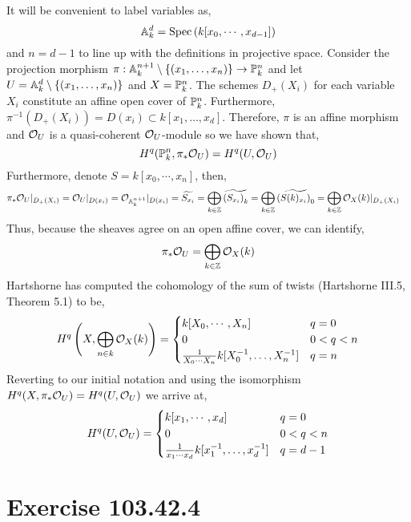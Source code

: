 \documentclass[12pt]{article}
\begin{document}
It will be convenient to label variables as,
\[ \A^d_k = \Spec{k[x_0, \cdots, x_{d-1}]} \]
and $n = d-1$ to line up with the definitions in projective space. Consider the projection morphism $\pi : \A^{n+1}_k \setminus \{ (x_1, \dots, x_n) \} \to \P^{n}_k$ and let $U = \A^d_k \setminus \{ (x_1, \dots, x_n) \}$ and $X = \P^n_k$. The schemes $D_{+}(X_i)$ for each variable $X_i$ constitute an affine open cover of $\P^{n}_k$. Furthermore, $\pi^{-1}(D_{+}(X_i)) = D(x_{i}) \subset k[x_1, \dots, x_d]$. Therefore, $\pi$ is an affine morphism and $\struct{U}$ is a quasi-coherent $\struct{U}$-module so we have shown that,
\[ H^q(\P^{n}_k, \pi_* \struct{U}) = H^q(U, \struct{U}) \] 
Furthermore, denote $S = k[x_0, \cdots, x_n]$, then,
\begin{align*}
\pi_* \struct{U} |_{D_{+}(X_i)} & = \struct{U} |_{D(x_{i})} = \struct{\A^{n+1}_k} |_{D(x_{i})} = \widetilde{S_{x_{i}}}  = \bigoplus_{k \in \Z} \widetilde{\left( S_{x_i} \right)_k} = \bigoplus_{k \in \Z} \widetilde{\left( S(k)_{x_i} \right)_{0}} = \bigoplus_{k \in \Z} \struct{X}(k)|_{D_+(X_i)}
\end{align*}
Thus, because the sheaves agree on an open affine cover, we can identify,
\[ \pi_* \struct{U} = \bigoplus_{k \in \Z} \struct{X}(k) \]
Hartshorne has computed the cohomology of the sum of twists (Hartshorne III.5, Theorem 5.1) to be,
\[  H^q \left(X, \bigoplus_{n \in k} \struct{X}(k) \right) = 
\begin{cases}
k[X_0, \cdots, X_n] & q = 0
\\
0 & 0 < q < n
\\
\frac{1}{X_0 \cdots X_n} k[X_0^{-1}, \dots, X_n^{-1}] & q = n 
\end{cases} \]
Reverting to our initial notation and using the isomorphism $H^q(X, \pi_* \struct{U}) = H^q(U, \struct{U})$ we arrive at,
\[ H^q(U, \struct{U}) = 
\begin{cases}
k[x_1, \cdots, x_d] & q = 0
\\
0 & 0 < q < n
\\
\frac{1}{x_1 \cdots x_d} k[x_1^{-1}, \dots, x_d^{-1}] & q = d-1 
\end{cases} \]

\section{Exercise 103.42.4}
\end{document}
